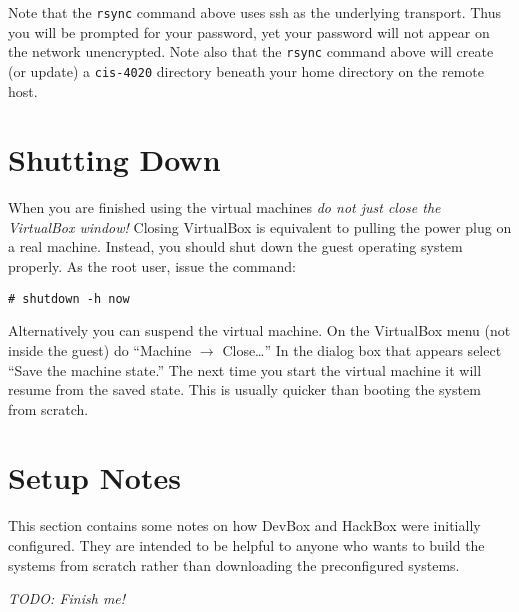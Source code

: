 \documentclass[twocolumn]{article}
\begin{document}
Note that the \texttt{rsync} command above uses ssh as the underlying transport. Thus you will
be prompted for your password, yet your password will not appear on the network unencrypted.
Note also that the \texttt{rsync} command above will create (or update) a \texttt{cis-4020}
directory beneath your home directory on the remote host.

\section{Shutting Down}

When you are finished using the virtual machines \emph{do not just close the VirtualBox window!}
Closing VirtualBox is equivalent to pulling the power plug on a real machine. Instead, you
should shut down the guest operating system properly. As the root user, issue the command:
\begin{Verbatim}
# shutdown -h now
\end{Verbatim}

Alternatively you can suspend the virtual machine. On the VirtualBox menu (not inside the guest)
do ``Machine $\rightarrow$ Close\ldots'' In the dialog box that appears select ``Save the
machine state.'' The next time you start the virtual machine it will resume from the saved
state. This is usually quicker than booting the system from scratch.

\section{Setup Notes}

This section contains some notes on how DevBox and HackBox were initially configured. They are
intended to be helpful to anyone who wants to build the systems from scratch rather than
downloading the preconfigured systems.

\textit{TODO: Finish me!}
\end{document}
